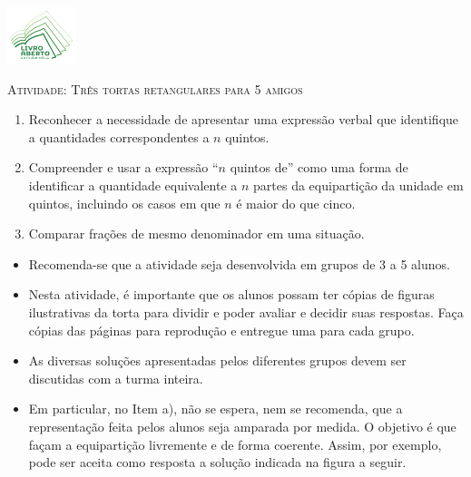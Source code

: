 \documentclass[10 pt,usenames,dvipsnames, oneside]{article}
\begin{document}
\begin{center}
  \begin{minipage}[l]{3cm}
\includegraphics[width=2cm]{logo}    
\end{minipage}\hfill
\begin{minipage}[r]{.8\textwidth}
 {\Large \scshape Atividade: Três tortas retangulares para 5 amigos}  
\end{minipage}
\end{center}
\vspace{.2cm}

\ifdefined\prof
\begin{goals}
\begin{enumerate}

\item Reconhecer a necessidade de apresentar uma expressão verbal que identifique a quantidades correspondentes a $n$ quintos.
\item Compreender e usar a expressão ``$n$ quintos de'' como uma forma de identificar a quantidade equivalente a $n$ partes da equipartição da unidade em quintos, incluindo os casos em que $n$ é maior do que cinco.
\item Comparar frações de mesmo denominador em uma situação.

\end{enumerate}
\tcblower

  \begin{itemize} %
  \item Recomenda-se que a atividade seja desenvolvida em grupos de 3 a 5 alunos.
  \item Nesta atividade, é importante que os alunos possam ter cópias de figuras ilustrativas da torta para dividir e poder avaliar e decidir suas respostas. Faça cópias das páginas para reprodução e entregue uma para cada grupo.
  \item       As diversas soluções apresentadas pelos diferentes grupos devem ser discutidas com a turma inteira.
  \item       Em particular, no Item a), não se espera, nem se recomenda, que a representação feita pelos alunos seja amparada por medida. O objetivo é que façam a equipartição livremente e de forma coerente. Assim, por exemplo, pode ser aceita como resposta a solução indicada na figura a seguir.



\end{itemize}
\end{goals}
\end{document}
